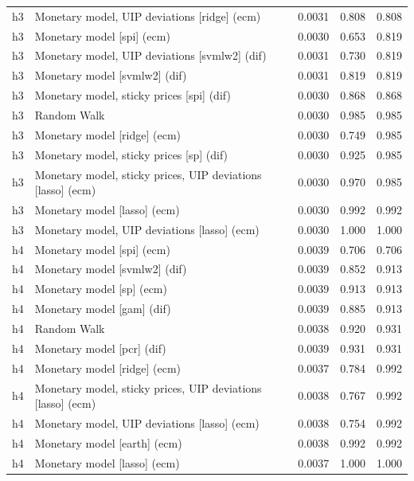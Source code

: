 \begin{ThreePartTable}
\begin{longtable}[t]{cp{5.5cm}ccc}
\addlinespace
h3 & \raggedright Monetary model, UIP deviations [ridge] (ecm) & 0.0031 & 0.808 & 0.808\\
h3 & \raggedright Monetary model [spi] (ecm) & 0.0030 & 0.653 & 0.819\\
h3 & \raggedright Monetary model, UIP deviations [svmlw2] (dif) & 0.0031 & 0.730 & 0.819\\
h3 & \raggedright Monetary model [svmlw2] (dif) & 0.0031 & 0.819 & 0.819\\
h3 & \raggedright Monetary model, sticky prices [spi] (dif) & 0.0030 & 0.868 & 0.868\\
h3 & \raggedright Random Walk & 0.0030 & 0.985 & 0.985\\
h3 & \raggedright Monetary model [ridge] (ecm) & 0.0030 & 0.749 & 0.985\\
h3 & \raggedright Monetary model, sticky prices [sp] (dif) & 0.0030 & 0.925 & 0.985\\
h3 & \raggedright Monetary model, sticky prices, UIP deviations [lasso] (ecm) & 0.0030 & 0.970 & 0.985\\
h3 & \raggedright Monetary model [lasso] (ecm) & 0.0030 & 0.992 & 0.992\\
h3 & \raggedright Monetary model, UIP deviations [lasso] (ecm) & 0.0030 & 1.000 & 1.000\\
\addlinespace
h4 & \raggedright Monetary model [spi] (ecm) & 0.0039 & 0.706 & 0.706\\
h4 & \raggedright Monetary model [svmlw2] (dif) & 0.0039 & 0.852 & 0.913\\
h4 & \raggedright Monetary model [sp] (ecm) & 0.0039 & 0.913 & 0.913\\
h4 & \raggedright Monetary model [gam] (dif) & 0.0039 & 0.885 & 0.913\\
h4 & \raggedright Random Walk & 0.0038 & 0.920 & 0.931\\
h4 & \raggedright Monetary model [pcr] (dif) & 0.0039 & 0.931 & 0.931\\
h4 & \raggedright Monetary model [ridge] (ecm) & 0.0037 & 0.784 & 0.992\\
h4 & \raggedright Monetary model, sticky prices, UIP deviations [lasso] (ecm) & 0.0038 & 0.767 & 0.992\\
h4 & \raggedright Monetary model, UIP deviations [lasso] (ecm) & 0.0038 & 0.754 & 0.992\\
h4 & \raggedright Monetary model [earth] (ecm) & 0.0038 & 0.992 & 0.992\\
h4 & \raggedright Monetary model [lasso] (ecm) & 0.0037 & 1.000 & 1.000\\

\end{longtable}
\end{ThreePartTable}

